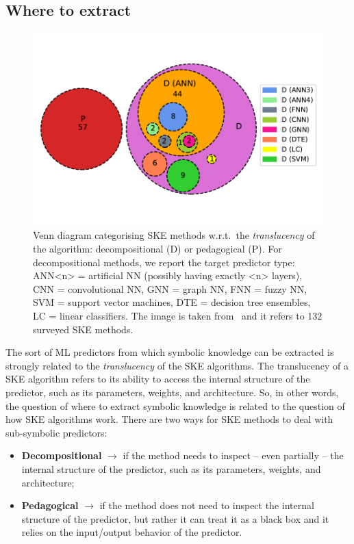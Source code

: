 \subsection{Where to extract}\label{subsec:where-to-extract}
%
\begin{figure}
    \centering
    \includegraphics[width=.6\linewidth]{figures/ske-translucency}
    \caption[Venn diagram categorising SKE methods]{
        Venn diagram categorising \gls{SKE} methods w.r.t.\ the \emph{translucency} of the algorithm: decompositional (D) or pedagogical (P).
        For decompositional methods, we report the target predictor type: ANN<n> = artificial \gls{NN} (possibly having exactly <n> layers), CNN = convolutional \gls{NN}, GNN = graph \gls{NN}, FNN = fuzzy \gls{NN}, SVM = support vector machines, DTE = decision tree ensembles, LC = linear classifiers.
        The image is taken from~\cite{DBLP:journals/csur/CiattoSAMO24} and it refers to 132 surveyed \gls{SKE} methods.
    }
    \label{fig:pie-ske-translucency}
\end{figure}
%
The sort of \gls{ML} predictors from which symbolic knowledge can be extracted is strongly related to the \emph{translucency} of the \gls{SKE} algorithms.
%
The translucency of a \gls{SKE} algorithm refers to its ability to access the internal structure of the predictor, such as its parameters, weights, and architecture.
%
So, in other words, the question of where to extract symbolic knowledge is related to the question of how \gls{SKE} algorithms work.
%
There are two ways for \gls{SKE} methods to deal with sub-symbolic predictors:
%
\begin{itemize}
    \item \textbf{Decompositional} $\rightarrow$ if the method needs to inspect -- even partially -- the internal structure of the predictor, such as its parameters, weights, and architecture;
    \item \textbf{Pedagogical} $\rightarrow$ if the method does not need to inspect the internal structure of the predictor, but rather it can treat it as a black box and it relies on the input/output behavior of the predictor.
\end{itemize}

